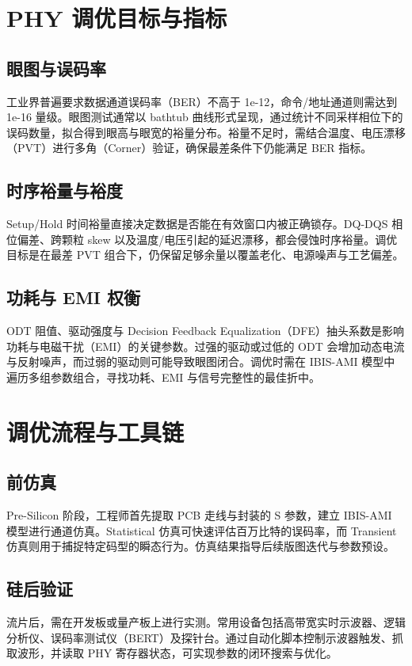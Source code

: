 \chapter{PHY 调优目标与指标}
\section{眼图与误码率}
工业界普遍要求数据通道误码率（BER）不高于 1e-12，命令/地址通道则需达到 1e-16 量级。眼图测试通常以 bathtub 曲线形式呈现，通过统计不同采样相位下的误码数量，拟合得到眼高与眼宽的裕量分布。裕量不足时，需结合温度、电压漂移（PVT）进行多角（Corner）验证，确保最差条件下仍能满足 BER 指标。\par
\section{时序裕量与裕度}
Setup/Hold 时间裕量直接决定数据是否能在有效窗口内被正确锁存。DQ-DQS 相位偏差、跨颗粒 skew 以及温度/电压引起的延迟漂移，都会侵蚀时序裕量。调优目标是在最差 PVT 组合下，仍保留足够余量以覆盖老化、电源噪声与工艺偏差。\par
\section{功耗与 EMI 权衡}
ODT 阻值、驱动强度与 Decision Feedback Equalization（DFE）抽头系数是影响功耗与电磁干扰（EMI）的关键参数。过强的驱动或过低的 ODT 会增加动态电流与反射噪声，而过弱的驱动则可能导致眼图闭合。调优时需在 IBIS-AMI 模型中遍历多组参数组合，寻找功耗、EMI 与信号完整性的最佳折中。\par
\chapter{调优流程与工具链}
\section{前仿真}
Pre-Silicon 阶段，工程师首先提取 PCB 走线与封装的 S 参数，建立 IBIS-AMI 模型进行通道仿真。Statistical 仿真可快速评估百万比特的误码率，而 Transient 仿真则用于捕捉特定码型的瞬态行为。仿真结果指导后续版图迭代与参数预设。\par
\section{硅后验证}
流片后，需在开发板或量产板上进行实测。常用设备包括高带宽实时示波器、逻辑分析仪、误码率测试仪（BERT）及探针台。通过自动化脚本控制示波器触发、抓取波形，并读取 PHY 寄存器状态，可实现参数的闭环搜索与优化。\par
